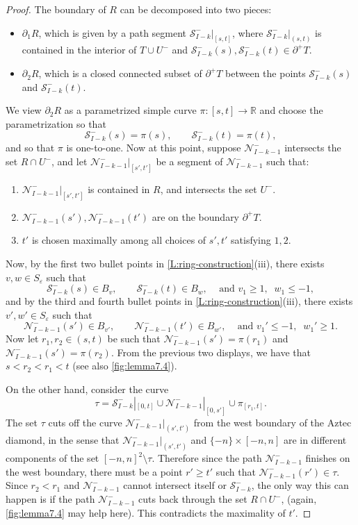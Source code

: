 \documentclass[11pt,twoside]{amsart}
\theoremstyle{plain}
\numberwithin{quest}{section}
\theoremstyle{remark}
\numberwithin{rem}{section}
\theoremstyle{definition}
\newcommand{\eps}{\varepsilon}
\newcommand{\R}{\mathbb{R}}
\newcommand{\cS}{\mathcal{S}}
\newcommand{\cN}{\mathcal{N}}
\begin{document}
\begin{proof}
    The boundary of $R$ can be decomposed into two pieces: 
	\begin{itemize}[nosep]
		\item $\partial_1 R$, which is given by a path segment $\cS_{I - k}^-|_{[s, t]}$, where $\cS_{I - k}^-|_{(s, t)}$ is contained in the interior of $T \cup U^-$ and $\cS_{I - k}^-(s), \cS_{I - k}^-(t) \in \partial^+ T$.
		\item  $\partial_2 R$, which is a closed connected subset of $\partial^+ T$ between the points $\cS_{I - k}^-(s)$ and $\cS_{I - k}^-(t)$.
	\end{itemize}
	We view $\partial_2 R$ as a parametrized simple curve $\pi:[s, t] \to \R$ and choose the parametrization so that 
	$$
	\cS_{I - k}^-(s) = \pi(s), \qquad \cS_{I - k}^-(t) = \pi(t),
	$$
	and so that $\pi$ is one-to-one. 
Now at this point, suppose $\cN_{I - k - 1}^-$ intersects the set $R \cap U^-$, and let $\cN_{I - k - 1}^-|_{[s', t']}$ be a segment of $\cN_{I - k - 1}^-$ such that:
	\begin{enumerate}[nosep, label=\arabic*.]
		\item $\cN_{I - k - 1}^-|_{[s', t']}$ is contained in $R$, and intersects the set $U^-$.
		\item $\cN_{I - k - 1}^-(s'), \cN_{I - k - 1}^-(t')$ are on the boundary $\partial^+ T$.
		\item $t'$ is chosen maximally among all choices of $s', t'$ satisfying $1, 2$.
	\end{enumerate}
    Now, by the first two bullet points in \cref{L:ring-construction}(iii), there exists $v, w \in S_\eps$ such that
	$$
	\cS_{I - k}^-(s) \in B_{v}, \qquad \cS_{I - k}^-(t) \in B_{w}, \;\;\; \text{ and } v_{1} \ge 1, \;\; w_{1} \le -1,
	$$
	and by the third and fourth bullet points in \cref{L:ring-construction}(iii), there exists $v', w' \in S_\eps$ such that
	$$
	\cN_{I - k-1}^-(s') \in B_{v'}, \qquad \cN_{I - k-1}^-(t') \in B_{w'}, \;\;\; \text{ and } v_{1}' \le -1, \;\; w_{1}' \ge 1.
	$$
Now let $r_1, r_2 \in (s, t)$ be such that $\mathcal N_{I-k-1}^-(s') = \pi(r_1)$ and $\mathcal N_{I-k-1}^-(s') = \pi(r_2)$. From the previous two displays, we have that $s < r_2 < r_1 < t$ (see also \cref{fig:lemma7.4}).

On the other hand, consider the curve
$$
\tau = \cS_{I-k}^-|_{[0, t]} \cup \cN_{I-k-1}^-|_{[0, s']} \cup \pi_{[r_1, t]}.
$$
The set $\tau$ cuts off the curve $\cN_{I-k-1}^-|_{(s', t')}$ from the west boundary of the Aztec diamond, in the sense that $\cN_{I-k-1}^-|_{(s', t')}$ and $\{-n\} \times [-n, n]$ are in different components of the set $[-n, n]^2 \setminus \tau$. Therefore since the path $\cN_{I-k-1}^-$ finishes on the west boundary, there must be a point $r' \ge t'$ such that $\cN_{I-k-1}^-(r') \in \tau$. Since $r_2 < r_1$ and $\cN_{I-k-1}^-$ cannot intersect itself or $\cS_{I-k}^-$, the only way this can happen is if the path $\cN_{I-k-1}^-$ cuts back through the set $R \cap U^-$, (again, \cref{fig:lemma7.4} may help here). This contradicts the maximality of $t'$.
    

\end{proof}
\end{document}
